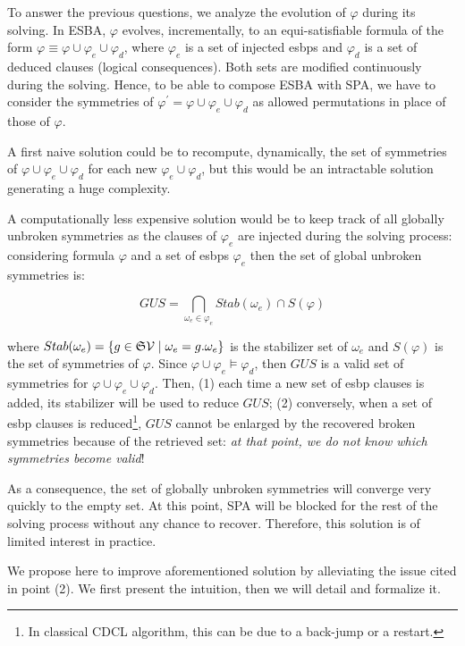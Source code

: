 To answer the previous questions, we analyze the evolution of $\varphi$ during
its solving. In ESBA, $\varphi$ evolves, incrementally, to an
equi-satisfiable formula of the form $\varphi \equiv \varphi \cup \varphi_e
\cup \varphi_d$, where $\varphi_e$ is a set of injected esbps and $\varphi_d$
is a set of deduced clauses (logical consequences). Both sets are modified continuously during the solving. Hence, to be able to compose ESBA with SPA, we have to consider the symmetries of $\varphi^\prime=\varphi \cup \varphi_e \cup \varphi_d$ as
allowed permutations in place of those of $\varphi$.


A first naive solution could be to recompute, dynamically, the set of symmetries of $\varphi
\cup \varphi_e \cup \varphi_d$ for each new $\varphi_e \cup \varphi_d$, but
this would be an intractable solution generating a huge complexity. 

A  computationally less expensive solution would be to keep track of all globally unbroken symmetries as the clauses of $\varphi_e$ are injected during the solving process: considering formula $\varphi$ and 
a set of esbps $\varphi_e$ then the set of global unbroken symmetries is:

$$GUS = \underset{\omega_e \in \varphi_e}{\bigcap}Stab(\omega_e) \cap S(\varphi)$$

 where  $Stab(\omega_e)=\{g \in \mathfrak{S}{\mathcal{V}}\mid
\omega_e=g.\omega_e\}$ is the stabilizer set of $\omega_e$ and $S(\varphi)$ is the set of symmetries of $\varphi$. 
Since $\varphi \cup \varphi_e  \models \varphi_d$, then $GUS$ is a valid set of symmetries for $\varphi \cup \varphi_e \cup \varphi_d$.
Then, (1) each time a new set of esbp clauses is added, its stabilizer will be used to reduce $GUS$;
(2) conversely, when a set of esbp clauses is reduced\footnote{In classical CDCL algorithm, this can be due to a back-jump or a restart.},
$GUS$ cannot be enlarged by the recovered broken symmetries because of the retrieved set:
\textit{at that point, we do not know which symmetries become valid}! 

As a consequence, the set of globally unbroken symmetries will converge very quickly to the empty set. 
At this point, SPA will be blocked for the rest of the solving process without any chance to recover.
 Therefore, this solution is of limited interest in practice.

We propose here to improve aforementioned solution by alleviating the issue cited in point (2).
We first present the intuition, then we will detail and formalize it. 

